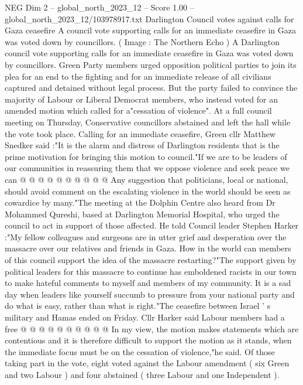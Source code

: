 \begin{textsample}{NEG Dim 2 – global\_north\_2023\_12 – Score 1.00 – global\_north\_2023\_12/103978917.txt}  \label{ex:f2_neg_209}
Darlington Council votes against calls for Gaza ceasefire A council vote supporting calls for an immediate ceasefire in Gaza was voted down by councillors. ( Image : The Northern Echo ) A Darlington council vote supporting calls for an immediate ceasefire in Gaza was voted down by councillors.
Green Party members urged opposition political parties to join its plea for an end to the fighting and for an immediate release of all civilians captured and detained without legal process.
But the party failed to convince the majority of Labour or Liberal Democrat members, who instead voted for an amended motion which called for a"cessation of violence".
At a full council meeting on Thursday, Conservative councillors abstained and left the hall while the vote took place.
Calling for an immediate ceasefire, Green cllr Matthew Snedker said :"It is the alarm and distress of Darlington residents that is the prime motivation for bringing this motion to council."If we are to be leaders of our communities in reassuring them that we oppose violence and seek peace we can @ @ @ @ @ @ @ @ @ @ Any suggestion that politicians, local or national, should avoid comment on the escalating violence in the world should be seen as cowardice by many."The meeting at the Dolphin Centre also heard from Dr Mohammed Qureshi, based at Darlington Memorial Hospital, who urged the council to act in support of those affected.
He told Council leader Stephen Harker :"My fellow colleagues and surgeons are in utter grief and desperation over the massacre over our relatives and friends in Gaza.
How in the world can members of this council support the idea of the massacre restarting?"The support given by political leaders for this massacre to continue has emboldened racists in our town to make hateful comments to myself and members of my community.
It is a sad day when leaders like yourself succumb to pressure from your national party and do what is easy, rather than what is right."The ceasefire between Israel ' s military and Hamas ended on Friday.
Cllr Harker said Labour members had a free @ @ @ @ @ @ @ @ @ @ In my view, the motion makes statements which are contentious and it is therefore difficult to support the motion as it stands, when the immediate focus must be on the cessation of violence,"he said.
Of those taking part in the vote, eight voted against the Labour amendment ( six Green and two Labour ) and four abstained ( three Labour and one Independent ).

\end{textsample}
